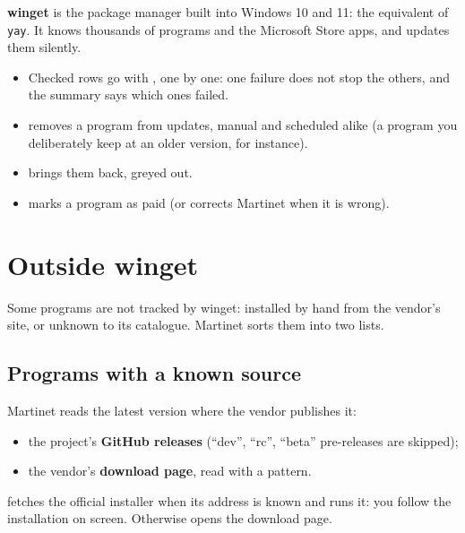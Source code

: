 \textbf{winget} is the package manager built into Windows 10 and 11: the equivalent of \texttt{yay}.
It knows thousands of programs and the Microsoft Store apps, and updates them silently.


\begin{itemize}
\item Checked rows go with , one by one: one failure does not stop the others,
and the summary says which ones failed.
\item {} removes a program from updates, manual and scheduled alike (a
program you deliberately keep at an older version, for instance).
\item {} brings them back, greyed out.
\item {} marks a program as paid (or corrects Martinet when it is wrong).
\end{itemize}



\section{Outside winget}\label{sec:hors}

Some programs are not tracked by winget: installed by hand from the vendor's site, or unknown to its
catalogue. Martinet sorts them into two lists.


\subsection{Programs with a known source}

Martinet reads the latest version where the vendor publishes it:
\begin{itemize}
\item the project's \textbf{GitHub releases} (“dev”, “rc”, “beta” pre-releases are skipped);
\item the vendor's \textbf{download page}, read with a pattern.
\end{itemize}
 fetches the official installer when its address is known and runs it:
you follow the installation on screen. Otherwise  opens the download page.

